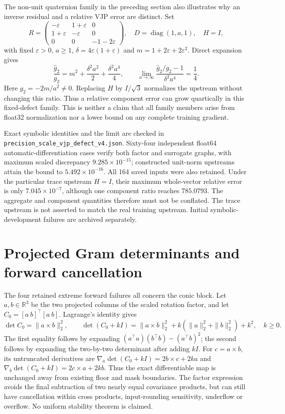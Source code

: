 \documentclass[11pt,a4paper]{article}
\newcommand{\R}{\mathbb{R}}
\begin{document}
The non-unit quaternion family in the preceding section also illustrates
why an inverse residual and a relative VJP error are distinct. Set
\[
 R=\begin{pmatrix}-\varepsilon&1+\varepsilon&0\\
 1+\varepsilon&-\varepsilon&0\\0&0&-1-2\varepsilon\end{pmatrix},
 \quad D=\operatorname{diag}(1,a,1),\quad H=I,
\]
with fixed $\varepsilon>0$, $a\ge1$,
$\delta=4\varepsilon(1+\varepsilon)$ and $m=1+2\varepsilon+2\varepsilon^2$.
Direct expansion gives
\[
 \frac{\widehat g_2}{g_2}
 =m^2+\frac{\delta^2a^2}{2}+\frac{\delta^2a^4}{4},
 \qquad
 \lim_{a\to\infty}
 \frac{\widehat g_2/g_2-1}{\delta^2a^4}=\frac14.
\]
Here $g_2=-2m/a^2\ne0$. Replacing $H$ by $I/\sqrt3$ normalizes the
upstream without changing this ratio. Thus a relative component error
can grow quartically in this fixed-defect family. This is neither a
claim that all family members arise from float32 normalization nor a
lower bound on any complete training gradient.

Exact symbolic identities and the limit are checked in
\texttt{precision\_scale\_vjp\_defect\_v4.json}. Sixty-four independent
float64 automatic-differentiation cases verify both factor and surrogate
graphs, with maximum scaled discrepancy $9.285\times10^{-15}$;
constructed unit-norm upstreams attain the bound to $5.492\times10^{-16}$.
All 164 saved inputs were also retained. Under the particular trace
upstream $H=I$, their maximum whole-vector relative error is only
$7.045\times10^{-7}$, although one component ratio reaches $785.0793$.
The aggregate and component quantities therefore must not be conflated.
The trace upstream is not asserted to match the real training upstream.
Initial symbolic-development failures are archived separately.

\section{Projected Gram determinants and forward cancellation}
The four retained extreme forward failures all concern the conic block.
Let $a,b\in\R^3$ be the two projected columns of the scaled rotation
factor, and let $C_0=[a\ b]^\top[a\ b]$. Lagrange's identity gives
\[
 \det C_0=\|a\times b\|_2^2,
 \qquad
 \det(C_0+kI)=\|a\times b\|_2^2+
 k(\|a\|_2^2+\|b\|_2^2)+k^2,\quad k\ge0.
\]
The first equality follows by expanding
$(a^\top a)(b^\top b)-(a^\top b)^2$; the second follows by
expanding the two-by-two determinant after adding $kI$.
For $c=a\times b$, its untruncated derivatives are
$\nabla_a\det(C_0+kI)=2b\times c+2ka$ and
$\nabla_b\det(C_0+kI)=2c\times a+2kb$.
Thus the exact differentiable map is unchanged away from existing
floor and mask boundaries. The factor expression avoids the final
subtraction of two nearly equal covariance products, but can still
have cancellation within cross products, input-rounding sensitivity,
underflow or overflow. No uniform stability theorem is claimed.
\end{document}

